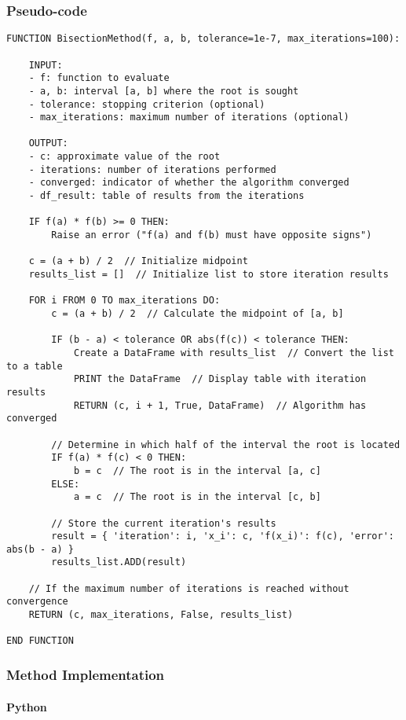 \documentclass{article}
\begin{document}
    \subsubsection{Pseudo-code}
        \begin{lstlisting}
FUNCTION BisectionMethod(f, a, b, tolerance=1e-7, max_iterations=100):

    INPUT:
    - f: function to evaluate
    - a, b: interval [a, b] where the root is sought
    - tolerance: stopping criterion (optional)
    - max_iterations: maximum number of iterations (optional)

    OUTPUT:
    - c: approximate value of the root
    - iterations: number of iterations performed
    - converged: indicator of whether the algorithm converged
    - df_result: table of results from the iterations

    IF f(a) * f(b) >= 0 THEN:
        Raise an error ("f(a) and f(b) must have opposite signs")

    c = (a + b) / 2  // Initialize midpoint
    results_list = []  // Initialize list to store iteration results

    FOR i FROM 0 TO max_iterations DO:
        c = (a + b) / 2  // Calculate the midpoint of [a, b]

        IF (b - a) < tolerance OR abs(f(c)) < tolerance THEN:
            Create a DataFrame with results_list  // Convert the list to a table
            PRINT the DataFrame  // Display table with iteration results
            RETURN (c, i + 1, True, DataFrame)  // Algorithm has converged

        // Determine in which half of the interval the root is located
        IF f(a) * f(c) < 0 THEN:
            b = c  // The root is in the interval [a, c]
        ELSE:
            a = c  // The root is in the interval [c, b]

        // Store the current iteration's results
        result = { 'iteration': i, 'x_i': c, 'f(x_i)': f(c), 'error': abs(b - a) }
        results_list.ADD(result)

    // If the maximum number of iterations is reached without convergence
    RETURN (c, max_iterations, False, results_list)

END FUNCTION
\end{lstlisting}

    \subsubsection{Method Implementation}
    \paragraph{Python}
\end{document}

